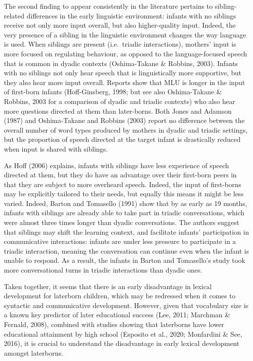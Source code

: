 \documentclass[
  english,
  man,floatsintext]{apa6}
\begin{document}
The second finding to appear consistently in the literature pertains to sibling-related differences in the early linguistic environment: infants with no siblings receive not only more input overall, but also higher-quality input. Indeed, the very presence of a sibling in the linguistic environment changes the way language is used. When siblings are present (i.e.~triadic interactions), mothers' input is more focused on regulating behaviour, as opposed to the language-focused speech that is common in dyadic contexts (Oshima-Takane \& Robbins, 2003). Infants with no siblings not only hear speech that is linguistically more supportive, but they also hear more input overall. Reports show that MLU is longer in the input of first-born infants (Hoff-Ginsberg, 1998; but see also Oshima-Takane \& Robbins, 2003 for a comparison of dyadic and triadic contexts) who also hear more questions directed at them than later-borns. Both Jones and Adamson (1987) and Oshima-Takane and Robbins (2003) report no difference between the overall number of word types produced by mothers in dyadic and triadic settings, but the proportion of speech directed at the target infant is drastically reduced when input is shared with siblings.

As Hoff (2006) explains, infants with siblings have less experience of speech directed at them, but they do have an advantage over their first-born peers in that they are subject to more overheard speech. Indeed, the input of first-borns may be explicitly tailored to their needs, but equally this means it might be less varied. Indeed, Barton and Tomasello (1991) show that by as early as 19 months, infants with siblings are already able to take part in triadic conversations, which were almost three times longer than dyadic conversations. The authors suggest that siblings may shift the learning context, and facilitate infants' participation in communicative interactions: infants are under less pressure to participate in a triadic interaction, meaning the conversation can continue even when the infant is unable to respond. As a result, the infants in Barton and Tomasello's study took more conversational turns in triadic interactions than dyadic ones.

Taken together, it seems that there is an early disadvantage in lexical development for laterborn children, which may be redressed when it comes to syntactic and communicative development. However, given that vocabulary size is a known key predictor of later educational success (Lee, 2011; Marchman \& Fernald, 2008), combined with studies showing that laterborns have lower educational attainment by high school (Esposito et al., 2020; Monfardini \& See, 2016), it is crucial to understand the disadvantage in early lexical development amongst laterborns.
\end{document}
